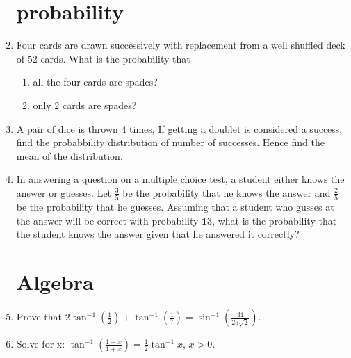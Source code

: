 \documentclass[10pt,-letter paper]{article}
\let\vec\mathbf{}
\let\vec\mathbf{}
\let\vec\mathbf{}
\providecommand{\brak}[1]{\ensuremath{\left(#1\right)}}
\begin{document}
\begin{enumerate}
\section{probability}
\item Four cards are drawn successively with replacement from a well shuffled deck of 52 cards. What is the probability that
\begin{enumerate}
\item all the four cards are spades?
\item only 2 cards are spades?
\end{enumerate}
\item A pair of dice is thrown 4 times, If getting a doublet is considered a success, find the probabbility distribution of number of successes. Hence find the mean of the distribution. \\
\item In answering a question on a multiple choice test, a student either knows the answer or guesses. Let $\frac{3}{5}$ be the probability that he knows the answer and $\frac{2}{5}$ be the probability that he guesses. Assuming that a student who gusses at the answer will be correct with probability $\vec{1}{3}$, what is the probability that the student knows the answer given that he answered it correctly?\\
\section{Algebra}
\item Prove that $2\tan^{-1}\brak{\frac{1}{2}}+\tan^{-1}\brak{\frac{1}{7}} = \sin^{-1}\brak{\frac{31}{25\sqrt{2}}}$. \\
\item Solve for x: $\tan^{-1}\brak{\frac{1-x}{1+x}} = \frac{1}{2}\tan^{-1}x$, $x>0$. \\

\end{enumerate}
\end{document}
